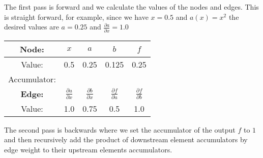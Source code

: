 The first pass is forward and we calculate the values of the nodes and edges.
This is straight forward, for example, since we have $x=0.5$ and $a(x)=x^2$ the desired values are $a=0.25$ and $\frac{\partial a}{\partial x} = 1.0$
\begin{multicols}{2}
	\columnbreak
	\centering
	\begin{center}
\begin{tabular}{|c|c|c|c|c|}
	\hline
	\bf Node:\phantom{\bigg|} &$x$&$a$&$b$&$f$\\
	\hline
	Value: &0.5&0.25&0.125&0.25\\
	Accumulator: &&&&\\
	\hline
	\hline
	\bf Edge:\phantom{\bigg|} &$\frac{\partial a}{\partial x}$&$\frac{\partial b}{\partial x}$&$\frac{\partial f}{\partial a}$&$\frac{\partial f}{\partial b}$\\
	\hline
	Value: &1.0&0.75&0.5&1.0\\
	\hline
\end{tabular}
	\end{center}
\end{multicols}

The second pass is backwards where we set the accumulator of the output $f$ to $1$ and then recursively add the product of downstream element accumulators by edge weight to their upstream elements accumulators.

